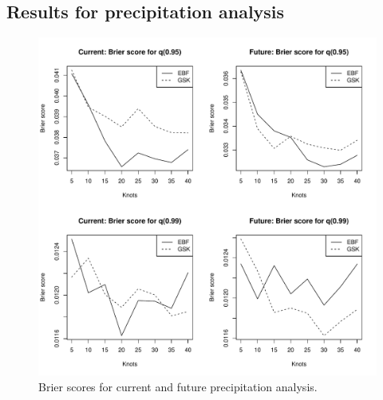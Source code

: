 \documentclass[11pt]{article}
\begin{document}
\subsection{Results for precipitation analysis}\label{ebs:results-precip}

\begin{figure}  %
  \centering
  \includegraphics[width=\linewidth]{plots/precip-bs.pdf}
  \caption{Brier scores for current and future precipitation analysis.}
  \label{ebfig:precip-bs}
\end{figure}
\end{document}

